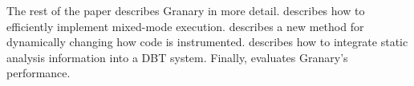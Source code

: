 \documentclass[preprint]{sigplanconf}
\begin{document}
%
%
%
%


The rest of the paper describes Granary in more detail.  describes how to efficiently implement mixed-mode execution.  describes a new method for dynamically changing how code is instrumented.  describes how to integrate static analysis information into a DBT system. Finally,  evaluates Granary's performance.
\end{document}

